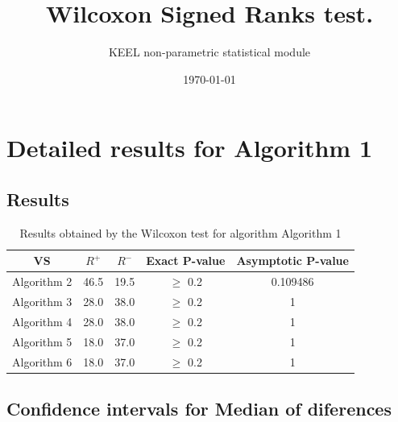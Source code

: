 \documentclass[a4paper,10pt]{article}
\title{Wilcoxon Signed Ranks test.}
\date{\today}
\author{KEEL non-parametric statistical module}
\begin{document}
\pagestyle{empty}
\maketitle
\thispagestyle{empty}



\section{Detailed results for Algorithm 1}


\subsection{Results}

\begin{table}[!htp]
\centering\small
\begin{tabular}{
|c|c|c|c|c|}
\hline
 VS & $R^{+}$ & $R^{-}$ & Exact P-value & Asymptotic P-value \\ \hline 
Algorithm 2 & 46.5 & 19.5 & $\geq$ 0.2 & 0.109486\\ \hline 
Algorithm 3 & 28.0 & 38.0 & $\geq$ 0.2 & 1\\ \hline 
Algorithm 4 & 28.0 & 38.0 & $\geq$ 0.2 & 1\\ \hline 
Algorithm 5 & 18.0 & 37.0 & $\geq$ 0.2 & 1\\ \hline 
Algorithm 6 & 18.0 & 37.0 & $\geq$ 0.2 & 1\\ \hline 

\end{tabular}
\caption{Results obtained by the Wilcoxon test for algorithm Algorithm 1}
\end{table}

\subsection{Confidence intervals for Median of diferences}
\end{document}
